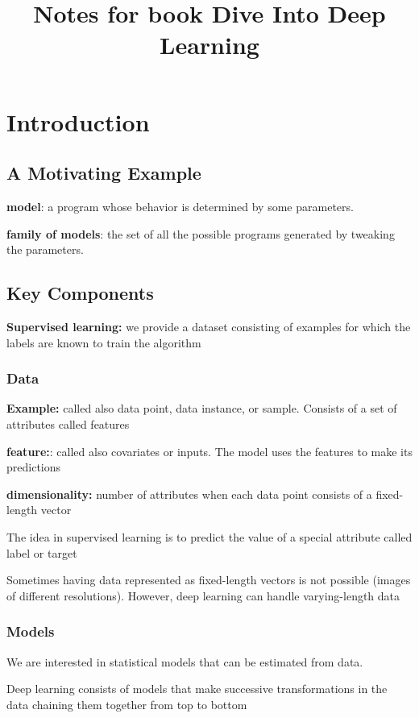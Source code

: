 \documentclass[]{article}
\title{Notes for book Dive Into Deep Learning}
\begin{document}
\maketitle

\tableofcontents

\section{Introduction}
\subsection{A Motivating Example}

\textbf{model}: a program whose behavior is determined by some parameters.

\textbf{family of models}: the set of all the possible programs generated by tweaking the parameters.

\subsection{Key Components}
\textbf{Supervised learning:} we provide a dataset consisting of examples for which the labels are known to train the algorithm

\subsubsection{Data}
\textbf{Example:} called also data point, data instance, or sample. Consists of
a set of attributes called features

\noindent\textbf{feature:}: called also covariates or inputs. The model uses the features to make its predictions

\textbf{dimensionality:} number of attributes when each data point consists of a fixed-length vector

\noindent The idea in supervised learning is to predict the value of a special attribute called label or target

Sometimes having data represented as fixed-length vectors is not possible (images of different resolutions).
However, deep learning can handle varying-length data

\subsubsection{Models}
We are interested in statistical models that can be estimated from data.

Deep learning consists of models that make successive transformations in the data
chaining them together from top to bottom
\end{document}
